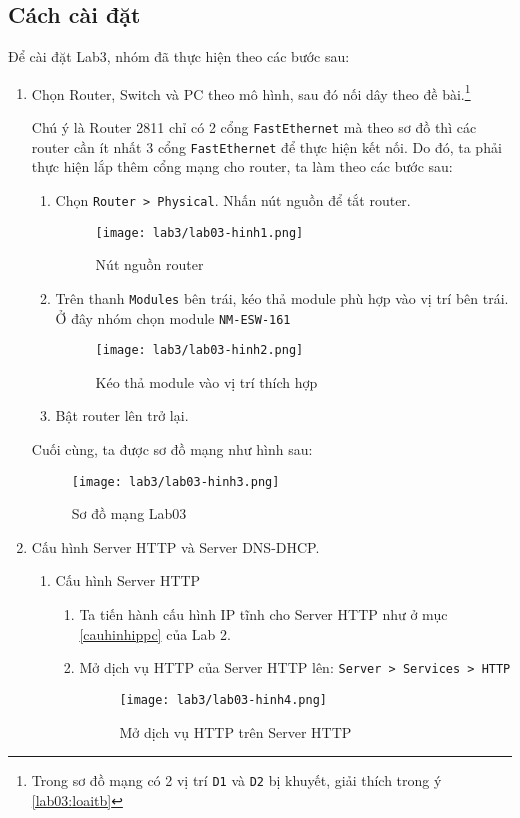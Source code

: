 \documentclass[]{article}
\begin{document}
\subsection{Cách cài đặt}
Để cài đặt Lab3, nhóm đã thực hiện theo các bước sau:
\begin{enumerate}
\item Chọn Router, Switch và PC theo mô hình, sau đó nối dây theo đề bài.\footnote{Trong sơ đồ mạng có 2 vị trí \texttt{D1} và \texttt{D2} bị khuyết, giải thích trong ý \ref{lab03:loaitb}}

Chú ý là Router 2811 chỉ có 2 cổng \texttt{FastEthernet} mà theo sơ đồ thì các router cần ít nhất 3 cổng \texttt{FastEthernet} để thực hiện kết nối. Do đó, ta phải thực hiện lắp thêm cổng mạng cho router, ta làm theo các bước sau:
\begin{enumerate}
\item Chọn \texttt{Router > Physical}. Nhấn nút nguồn để tắt router.
\begin{figure}[H]
\centering
\texttt{[image: lab3/lab03-hinh1.png]}
\caption{Nút nguồn router}
\end{figure}
\item Trên thanh \texttt{Modules} bên trái, kéo thả module phù hợp vào vị trí bên trái. Ở đây nhóm chọn module \texttt{NM-ESW-161}\label{ganthem}
\begin{figure}[H]
\centering
\texttt{[image: lab3/lab03-hinh2.png]}
\caption{Kéo thả module vào vị trí thích hợp}
\end{figure}
\item Bật router lên trở lại.
\end{enumerate}
Cuối cùng, ta được sơ đồ mạng như hình sau:
\begin{figure}[H]
\centering
\texttt{[image: lab3/lab03-hinh3.png]}
\caption{Sơ đồ mạng Lab03}
\end{figure}
\item Cấu hình Server HTTP và Server DNS-DHCP.
\begin{enumerate}
\item Cấu hình Server HTTP
\begin{enumerate}
\item Ta tiến hành cấu hình IP tĩnh cho Server HTTP như ở mục \ref{cauhinhippc} của Lab 2.
\item Mở dịch vụ HTTP của Server HTTP lên: \texttt{Server > Services > HTTP}
\begin{figure}[H]
\centering
\texttt{[image: lab3/lab03-hinh4.png]}
\caption{Mở dịch vụ HTTP trên Server HTTP}

\end{figure}
\end{enumerate}
\end{enumerate}
\end{enumerate}
\end{document}
